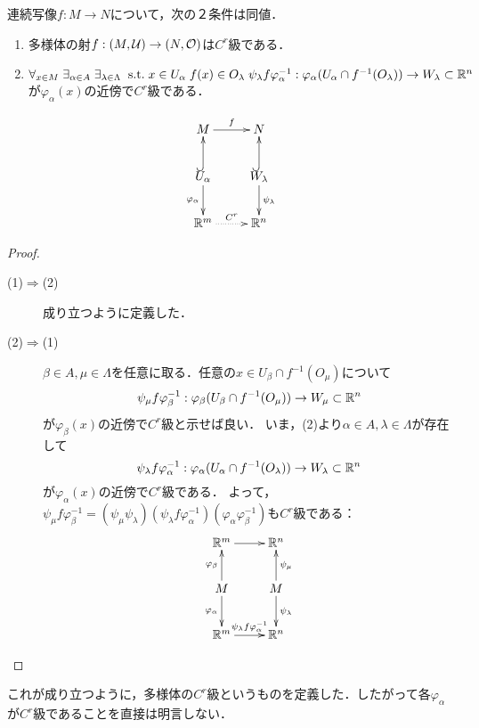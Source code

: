 \documentclass[uplatex,dvipdfmx]{jsreport}
\begin{document}
\begin{lemma}
    連続写像$f:M\to N$について，次の２条件は同値．
    \begin{enumerate}
        \item 多様体の射$f:(M,\mathcal{U})\to(N,\mathcal{O})$は$C^r$級である．
        \item $\forall_{x\in M}\;\exists_{\alpha\in A}\;\exists_{\lambda\in\Lambda}\;\;\mathrm{s.t.}\; x\in U_\alpha\;f(x)\in O_\lambda\;\psi_\lambda f\varphi^{-1}_\alpha:\varphi_\alpha(U_\alpha\cap f^{-1}(O_\lambda))\to W_\lambda\subset\mathbb{R}^n$が$\varphi_\alpha(x)$の近傍で$C^r$級である．
    \end{enumerate}
    \[\xymatrix{
        M\ar[r]^-f&N\\
        U_{\alpha}\ar@{^{(}->}[u]\ar[d]_-{\varphi_\alpha}&W_\lambda\ar@{^{(}->}[u]\ar[d]^-{\psi_\lambda}\\
        \R^m\ar@{.>}[r]^-{C^r}&\R^n
    }\]
\end{lemma}
\begin{proof}\mbox{}
    \begin{description}
        \item[(1)$\Rightarrow$(2)] 成り立つように定義した．
        \item[(2)$\Rightarrow$(1)] 
        $\beta\in A,\mu\in\Lambda$を任意に取る．任意の$x\in U_\beta\cap f^{-1}(O_\mu)$について
        \[\psi_\mu f\varphi^{-1}_\beta:\varphi_\beta(U_\beta\cap f^{-1}(O_\mu))\to W_\mu\subset\mathbb{R}^n\]
        が$\varphi_\beta(x)$の近傍で$C^r$級と示せば良い．
        いま，(2)より$\alpha\in A,\lambda\in\Lambda$が存在して
        \[\psi_\lambda f\varphi^{-1}_\alpha:\varphi_\alpha(U_\alpha\cap f^{-1}(O_\lambda))\to W_\lambda\subset\mathbb{R}^n\]
        が$\varphi_\alpha(x)$の近傍で$C^r$級である．
        よって，$\psi_\mu f\varphi^{-1}_\beta=(\psi_\mu\psi_\lambda)(\psi_\lambda f\varphi^{-1}_\alpha)(\varphi_\alpha\varphi_\beta^{-1})$も$C^r$級である：
        \[\xymatrix{
            \R^m\ar[r]&\R^n\\
            M\ar[u]^-{\varphi_\beta}\ar[d]_-{\varphi_\alpha}&M\ar[u]_-{\psi_\mu}\ar[d]^-{\psi_\lambda}\\
            \R^m\ar[r]^-{\psi_\lambda f\varphi^{-1}_\alpha}&\R^n
        }\]
    \end{description}
\end{proof}
\begin{remarks}
    これが成り立つように，多様体の$C^r$級というものを定義した．したがって各$\varphi_\alpha$が$C^r$級であることを直接は明言しない．
\end{remarks}
\end{document}
